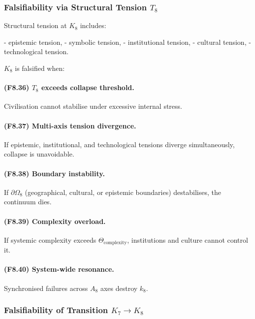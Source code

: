 \subsubsection{Falsifiability via Structural Tension \texorpdfstring{$T_8$}{T_8}}

Structural tension at $K_8$ includes:

- epistemic tension,
- symbolic tension,
- institutional tension,
- cultural tension,
- technological tension.

$K_8$ is falsified when:

\paragraph{(F8.36) \texorpdfstring{$T_8$}{T_8} exceeds collapse threshold.}
Civilisation cannot stabilise under excessive internal stress.

\paragraph{(F8.37) Multi-axis tension divergence.}
If epistemic, institutional, and technological tensions diverge simultaneously,
collapse is unavoidable.

\paragraph{(F8.38) Boundary instability.}
If $\partial\Omega_8$ (geographical, cultural, or epistemic boundaries)
destabilises, the continuum dies.

\paragraph{(F8.39) Complexity overload.}
If systemic complexity exceeds $\Theta_{\mathrm{complexity}}$,
institutions and culture cannot control it.

\paragraph{(F8.40) System-wide resonance.}
Synchronised failures across $A_8$ axes destroy $k_8$.



\subsubsection{Falsifiability of Transition \texorpdfstring{$K_7 \to K_8$}{K_7 \to K_8}}

